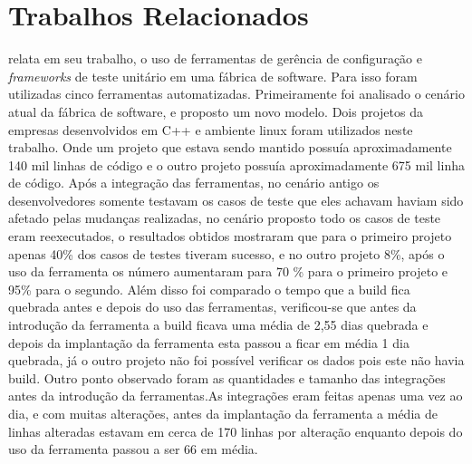 
\chapter{Trabalhos Relacionados}\label{trabalhorel}

 relata em seu trabalho, o uso de ferramentas de gerência de configuração e \textit{frameworks} de teste unitário em uma fábrica de software. Para isso foram utilizadas cinco ferramentas automatizadas. Primeiramente foi analisado o cenário atual da fábrica de software, e proposto um novo modelo. Dois projetos da empresas desenvolvidos em C++ e ambiente linux foram utilizados neste trabalho. Onde um projeto que estava sendo mantido possuía aproximadamente 140 mil linhas de código e o outro projeto possuía aproximadamente 675 mil linha de código. Após a integração das ferramentas, no cenário antigo os desenvolvedores somente testavam os casos de teste que eles achavam haviam sido afetado pelas mudanças realizadas, no cenário proposto todo os casos de teste eram reexecutados, o resultados obtidos mostraram que para o primeiro projeto apenas 40\% dos casos de testes tiveram sucesso, e no outro projeto 8\%, após o uso da ferramenta os número aumentaram para 70 \% para o primeiro projeto e 95\% para o segundo. Além disso foi comparado o tempo que a build fica quebrada antes e depois do uso das ferramentas, verificou-se que antes da introdução da ferramenta a build  ficava uma média de 2,55 dias quebrada e depois da implantação da ferramenta esta passou a ficar em média 1 dia quebrada, já o outro projeto não foi possível verificar os dados pois este não havia build. Outro ponto observado foram as quantidades e tamanho das integrações antes da introdução da ferramentas.As integrações eram feitas apenas uma vez ao dia, e com muitas alterações, antes da implantação da ferramenta a média de linhas alteradas estavam em cerca de 170 linhas por alteração enquanto depois do uso da ferramenta passou a ser 66 em média.